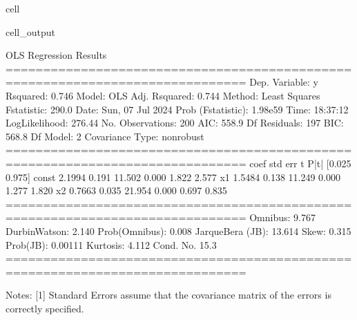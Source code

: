 \documentclass[letterpaper,10pt,english]{jupyterBook}
\begin{document}
\begin{sphinxuseclass}{cell}
\begin{sphinxVerbatimOutput}
\begin{sphinxuseclass}{cell_output}
\begin{sphinxVerbatim}[commandchars=\\\{\}]
                            OLS Regression Results                            
==============================================================================
Dep. Variable:                      y   R\PYGZhy{}squared:                       0.746
Model:                            OLS   Adj. R\PYGZhy{}squared:                  0.744
Method:                 Least Squares   F\PYGZhy{}statistic:                     290.0
Date:                Sun, 07 Jul 2024   Prob (F\PYGZhy{}statistic):           1.98e\PYGZhy{}59
Time:                        18:37:12   Log\PYGZhy{}Likelihood:                \PYGZhy{}276.44
No. Observations:                 200   AIC:                             558.9
Df Residuals:                     197   BIC:                             568.8
Df Model:                           2                                         
Covariance Type:            nonrobust                                         
==============================================================================
                 coef    std err          t      P\PYGZgt{}|t|      [0.025      0.975]
\PYGZhy{}\PYGZhy{}\PYGZhy{}\PYGZhy{}\PYGZhy{}\PYGZhy{}\PYGZhy{}\PYGZhy{}\PYGZhy{}\PYGZhy{}\PYGZhy{}\PYGZhy{}\PYGZhy{}\PYGZhy{}\PYGZhy{}\PYGZhy{}\PYGZhy{}\PYGZhy{}\PYGZhy{}\PYGZhy{}\PYGZhy{}\PYGZhy{}\PYGZhy{}\PYGZhy{}\PYGZhy{}\PYGZhy{}\PYGZhy{}\PYGZhy{}\PYGZhy{}\PYGZhy{}\PYGZhy{}\PYGZhy{}\PYGZhy{}\PYGZhy{}\PYGZhy{}\PYGZhy{}\PYGZhy{}\PYGZhy{}\PYGZhy{}\PYGZhy{}\PYGZhy{}\PYGZhy{}\PYGZhy{}\PYGZhy{}\PYGZhy{}\PYGZhy{}\PYGZhy{}\PYGZhy{}\PYGZhy{}\PYGZhy{}\PYGZhy{}\PYGZhy{}\PYGZhy{}\PYGZhy{}\PYGZhy{}\PYGZhy{}\PYGZhy{}\PYGZhy{}\PYGZhy{}\PYGZhy{}\PYGZhy{}\PYGZhy{}\PYGZhy{}\PYGZhy{}\PYGZhy{}\PYGZhy{}\PYGZhy{}\PYGZhy{}\PYGZhy{}\PYGZhy{}\PYGZhy{}\PYGZhy{}\PYGZhy{}\PYGZhy{}\PYGZhy{}\PYGZhy{}\PYGZhy{}\PYGZhy{}
const          2.1994      0.191     11.502      0.000       1.822       2.577
x1             1.5484      0.138     11.249      0.000       1.277       1.820
x2             0.7663      0.035     21.954      0.000       0.697       0.835
==============================================================================
Omnibus:                        9.767   Durbin\PYGZhy{}Watson:                   2.140
Prob(Omnibus):                  0.008   Jarque\PYGZhy{}Bera (JB):               13.614
Skew:                           0.315   Prob(JB):                      0.00111
Kurtosis:                       4.112   Cond. No.                         15.3
==============================================================================

Notes:
[1] Standard Errors assume that the covariance matrix of the errors is correctly specified.
\end{sphinxVerbatim}

\end{sphinxuseclass}\end{sphinxVerbatimOutput}

\end{sphinxuseclass}
\end{document}
